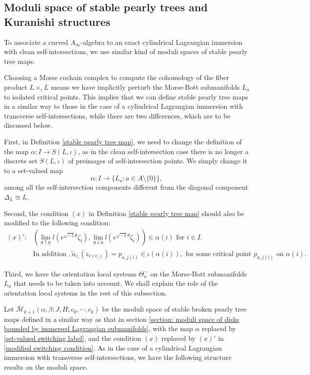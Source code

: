\documentclass{amsart}
\numberwithin{equation}{section}
\numberwithin{figure}{section}
\begin{document}
\subsection{Moduli space of stable pearly trees and Kuranishi structures}
	To associate a curved $A_{\infty}$-algebra to an exact cylindrical Lagrangian immersion with clean self-intersections, we use similar kind of moduli spaces of stable pearly tree maps. \par
	Choosing a Morse cochain complex to compute the cohomology of the fiber product $L \times_{\iota} L$ means we have implicitly perturb the Morse-Bott submanifolds $L_{a}$ to isolated critical points. This implies that we can define stable pearly tree maps in a similar way to those in the case of a cylindrical Lagrangian immersion with transverse self-intersections, while there are two differences, which are to be discussed below. \par
	First, in Definition \ref{stable pearly tree map}, we need to change the definition of the map $\alpha: I \to S(L, \iota)$, as in the clean self-intersection case there is no longer a discrete set $S(L, \iota)$ of preimages of self-intersection points. We simply change it to a set-valued map
\begin{equation}\label{set-valued switching label}
\alpha: I \to \{L_{a}: a \in A \setminus \{0\} \},
\end{equation}
among all the self-intersection components different from the diagonal component $\Delta_{L} \cong L$. \par
	Second, the condition $(x)$ in Definition \ref{stable pearly tree map} should also be modified to the following condition:
\begin{equation}\label{modified switching condition}
\begin{split}
(x)': &(\lim\limits_{\theta \uparrow 0} l(e^{\sqrt{-1}\theta}\zeta_{i}), \lim\limits_{\theta \downarrow 0} l(e^{\sqrt{-1}\theta}\zeta_{i})) \in \alpha(i) \text{ for } i \in I.\\
& \text{In addition }, \tilde{u}_{e_{i}}(z_{v(e_{i})}) = p_{a, j(i)} \in \iota(\alpha(i)), \text{ for some critical point } p_{a, j(i)} \text{ on } \alpha(i).
\end{split}
\end{equation}\par

	Third, we have the orientation local systems $\Theta_{a}^{-}$ on the Morse-Bott submanifolds $L_{a}$ that needs to be taken into account. We shall explain the role of the orientation local systems in the rest of this subsection. \par
	Let $\bar{\mathcal{M}}_{k+1}(\alpha, \beta; J, H; c_{0}, \cdots, c_{k})$ be the moduli space of stable broken pearly tree maps defined in a similar way as that in section \ref{section: moduli space of disks bounded by immersed Lagrangian submanifolds}, with the map $\alpha$ replaced by \eqref{set-valued switching label}, and the condition $(x)$ replaced by $(x)'$ in \eqref{modified switching condition}. As in the case of a cylindrical Lagrangian immersion with transverse self-intersections, we have the following structure results on the moduli space. \par
\end{document}
